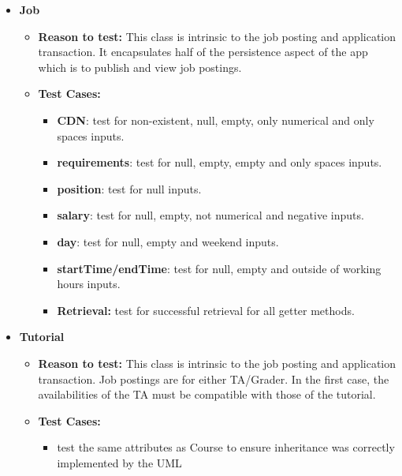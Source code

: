 \documentclass[12pt]{report}
\begin{document}
\begin{itemize}
        \item \textbf{Job}
        \begin{itemize}
            \item \textbf{Reason to test:} This class is intrinsic to the job posting and application transaction. It encapsulates half of the persistence aspect of the app which is to publish and view job postings.
            \item \textbf{Test Cases:} 
            \begin{itemize}
                \item \textbf{CDN}: test for non-existent, null, empty, only numerical and only spaces inputs.
                \item \textbf{requirements}: test for null, empty, empty and only spaces inputs.
                \item \textbf{position}: test for null inputs.
                \item \textbf{salary}: test for null, empty, not numerical and negative inputs.
                \item \textbf{day}: test for null, empty and weekend inputs.
               \item \textbf{startTime/endTime}: test for null, empty and outside of working hours inputs.
               \item \textbf{Retrieval:} test for successful retrieval for all getter methods.
            \end{itemize}
        \end{itemize}
        
        \item \textbf{Tutorial}
        \begin{itemize}
            \item \textbf{Reason to test:} This class is intrinsic to the job posting and application transaction. Job postings are for either TA/Grader. In the first case, the availabilities of the TA must be compatible with those of the tutorial.
            \item \textbf{Test Cases:} 
            \begin{itemize}
                \item test the same attributes as Course to ensure inheritance was correctly implemented by the UML
            \end{itemize}
        \end{itemize}
        

\end{itemize}
\end{document}
